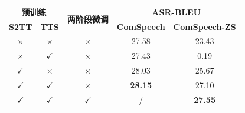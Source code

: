 \begin{table}[!htbp]
    \label{tab:comspeech_pretrain}
    \centering
    \small
    \begin{tabular}{ccccc}
        \toprule
        \multicolumn{2}{c}{\textbf{预训练}} & \multirow{2}{*}{\textbf{两阶段微调}} & \multicolumn{2}{c}{\textbf{ASR-BLEU}} \\
        \textbf{S2TT} & \textbf{TTS} & & \textbf{ComSpeech} & \textbf{ComSpeech-ZS} \\
        \midrule
        $\times$ & $\times$ & $\times$ & 27.58 & 23.43 \\
        $\times$ & $\checkmark$ & $\times$ & 27.43 & 0.19 \\
        $\checkmark$ & $\times$ & $\times$ & 28.03 & 25.67 \\
        $\checkmark$ & $\checkmark$ & $\times$ & \textbf{28.15} & 27.10 \\
        $\checkmark$ & $\checkmark$ & $\checkmark$ & / & \textbf{27.55} \\
        \bottomrule
    \end{tabular}
\end{table}
